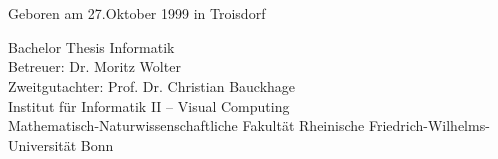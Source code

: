 \begin{titlepage}
    \begin{addmargin}[-1cm]{-3cm}
    \begin{center}
        \large

        \hfill

        \vfill

        \begingroup
            \centering %

            \color{CTtitle}\spacedallcaps{\myTitle} \\ \bigskip
        \endgroup

        \centering
        \spacedlowsmallcaps{\myName}\\ \bigskip
        Geboren am 27.Oktober 1999 in Troisdorf
        \vfill

        \begin{center} %
            \begin{minipage}{\textwidth}
                \centering
            \end{minipage}
        \end{center}
        \vfill


        Bachelor Thesis Informatik\\ \bigskip \bigskip
        Betreuer: Dr. Moritz Wolter \\
        Zweitgutachter: Prof. Dr. Christian Bauckhage \\ \medskip
        Institut für Informatik II – Visual Computing\\ \bigskip
        Mathematisch-Naturwissenschaftliche Fakultät
Rheinische Friedrich-Wilhelms-Universität Bonn\\ \bigskip \bigskip
     

        \myTime

        \vfill

    \end{center}
  \end{addmargin}
\end{titlepage}
